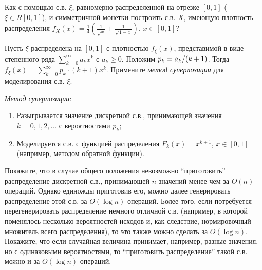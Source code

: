 \begin{problem}
Как с помощью с.в. $\xi $, равномерно распределенной на отрезке $\left[0,1\right]$ ($\xi \in R\left[0,1\right]$), и симметричной монетки построить с.в. $X$, имеющую плотность распределения $f_{X} (x)=\frac{1}{4} \left(\frac{1}{\sqrt{x} } +\frac{1}{\sqrt{1-x} } \right)$, $x\in \left[0,1\right]$?
\end{problem}

\begin{problem}

Пусть $\xi $ распределена на $\left[0,1\right]$ с плотностью $f_{\xi } (x)$, представимой в виде степенного ряда $\sum _{k=0}^{\infty }a_{k} x^{k}  $ с $a_{k} \ge 0$. Положим $p_{k} ={a_{k} \mathord{\left/ {\vphantom {a_{k}  (k+1)}} \right. \kern-\nulldelimiterspace} (k+1)} $. Тогда $f_{\xi } (x)=\sum _{k=0}^{\infty }p_{k} \cdot (k+1)x^{k}  $. Примените \textit{метод суперпозиции} для моделирования с.в. $\xi $.

\begin{ordre}
\textit{Метод суперпозиции}:

\begin{enumerate}
\item Разыгрывается значение дискретной с.в., принимающей значения $k=0,1,2,...$ с вероятностями $p_{k} $;

\item Моделируется с.в. с функцией распределения $F_{k} (x) = x^{k+1}$, $x\in [0,1]$ (например, методом обратной функции).
\end{enumerate}

\end{ordre}

\end{problem}


\begin{problem}
Покажите, что в случае общего положения невозможно ``приготовить'' распределение дискретной с.в., принимающей $n$ значений менее чем за $O(n)$ операций. Однако единожды приготовив его, можно далее генерировать распределение этой с.в. за $O(\log n)$ операций. Более того, если потребуется перегенерировать распределение немного отличной с.в. (например, в которой поменялось несколько вероятностей исходов и, как следствие, нормировочный множитель всего распределения), то это также можно сделать за $O(\log n)$. Покажите, что если случайная величина принимает, например, разные значения, но с одинаковыми вероятностями, то ``приготовить распределение''  такой с.в. можно и за $O(\log n)$ операций. 
\end{problem}

